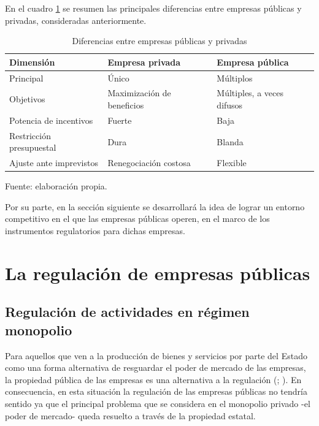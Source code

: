 \documentclass[
  12pt,
  spanish,
]{book}
\begin{document}
En el cuadro \ref{tab:cuadro5} se resumen las principales diferencias entre empresas públicas y privadas, consideradas anteriormente.

\begin{table}

\caption{\label{tab:cuadro5}Diferencias entre empresas públicas y privadas}
\centering
\begin{tabular}[t]{l|l|l}
\hline
Dimensión & Empresa privada & Empresa pública\\
\hline
Principal & Único & Múltiplos\\
\hline
Objetivos & Maximización de beneficios & Múltiples, a veces difusos\\
\hline
Potencia de incentivos & Fuerte & Baja\\
\hline
Restricción presupuestal & Dura & Blanda\\
\hline
Ajuste ante imprevistos & Renegociación costosa & Flexible\\
\hline
\end{tabular}
\end{table}

Fuente: elaboración propia.

Por su parte, en la sección siguiente se desarrollará la idea de lograr un entorno competitivo en el que las empresas públicas operen, en el marco de los instrumentos regulatorios para dichas empresas.

\hypertarget{la-regulaciuxf3n-de-empresas-puxfablicas}{%
\section{La regulación de empresas públicas}\label{la-regulaciuxf3n-de-empresas-puxfablicas}}

\hypertarget{regulaciuxf3n-de-actividades-en-ruxe9gimen-monopolio}{%
\subsection{Regulación de actividades en régimen monopolio}\label{regulaciuxf3n-de-actividades-en-ruxe9gimen-monopolio}}

Para aquellos que ven a la producción de bienes y servicios por parte del Estado como una forma alternativa de resguardar el poder de mercado de las empresas, la propiedad pública de las empresas es una alternativa a la regulación (\citet{Shleifer2005}; \citet{Viscusi2005}). En consecuencia, en esta situación la regulación de las empresas públicas no tendría sentido ya que el principal problema que se considera en el monopolio privado -el poder de mercado- queda resuelto a través de la propiedad estatal.
\end{document}
